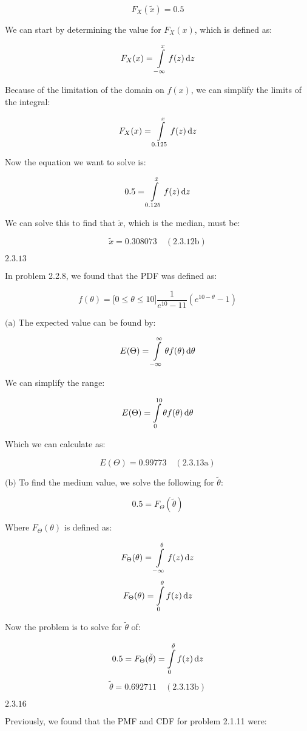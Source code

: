\documentclass{article}
\newcommand{\problem}[2]{$\boxed{\text{#1.#2}}$}
\newcommand{\subproblem}[3]{$\boxed{\text{(#3)}}$}
\newcommand{\subsolution}[4]{\boxed{#4\quad(\text{#1.#2#3})}}
\renewcommand{\d}[1]{\,\textnormal{d}#1}
\begin{document}
\[
F_X(\tilde{x})=0.5
\]

We can start by determining the value for $F_X(x)$, which is defined
as:

\[
F_X(x)=\int\limits_{-\infty}^x f(z)\d{z}
\]

Because of the limitation of the domain on $f(x)$, we can simplify the
limits of the integral:

\[
F_X(x)=\int\limits_{0.125}^x f(z)\d{z}
\]

Now the equation we want to solve is:

\[
0.5=\int\limits_{0.125}^{\tilde{x}} f(z)\d{z}
\]

We can solve this to find that $\tilde{x}$, which is the median, must
be:

\[
\subsolution{2.3}{12}{b}{\tilde{x}=0.308073}
\]

%
\problem{2.3}{13}

In problem 2.2.8, we found that the PDF was defined as:

\[
f(\theta)=\lbrack0\le\theta\le10\rbrack \frac{1}{e^{10}-11}\left(e^{10-\theta}-1\right)
\]

%
\subproblem{2.3}{13}{a} The expected value can be found by:

\[
E(\Theta)=\int\limits_{-\infty}^\infty \theta f(\theta)\d{\theta}
\]

We can simplify the range:

\[
E(\Theta)=\int\limits_{0}^{10} \theta f(\theta)\d{\theta}
\]

Which we can calculate as:

\[
\subsolution{2.3}{13}{a}{E(\Theta)=0.99773}
\]

%
\subproblem{2.3}{13}{b} To find the medium value, we solve the
following for $\tilde{\theta}$:

\[
0.5=F_\Theta(\tilde{\theta})
\]

Where $F_\Theta(\theta)$ is defined as:

\[
F_\Theta(\theta)=\int\limits_{-\infty}^\theta f(z)\d{z}
\] \[
F_\Theta(\theta)=\int\limits_{0}^\theta f(z)\d{z}
\]

Now the problem is to solve for $\tilde{\theta}$ of:

\[
0.5=F_\Theta(\tilde{\theta})=\int\limits_{0}^{\tilde{\theta}} f(z)\d{z}
\] \[
\subsolution{2.3}{13}{b}{\tilde{\theta}=0.692711}
\]

%
\problem{2.3}{16}

Previously, we found that the PMF and CDF for problem 2.1.11 were:
\end{document}

